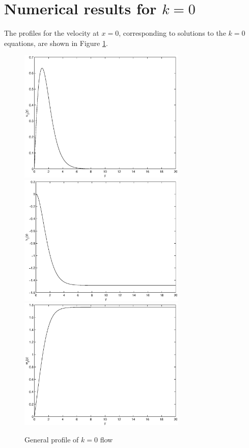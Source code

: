 \documentclass[10pt,a4paper]{report}
\begin{document}
\section{Numerical results for $k=0$}
The profiles for the velocity at $x=0$, corresponding to solutions to the $k=0$ equations, are shown in Figure \ref{zeroprofile}.
\begin{figure}[ht]
\centering
\includegraphics[width=8cm]{pics/u0prof.eps}
\includegraphics[width=8cm]{pics/v0prof.eps}
\includegraphics[width=8cm]{pics/w0prof.eps}
\caption{General profile of $k=0$ flow}
\label{zeroprofile}
\end{figure}
\end{document}
